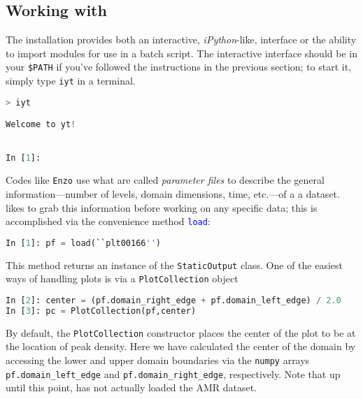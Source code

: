 
\subsection{Working with \yt}
The \yt installation provides both an interactive, {\it iPython}-like,
interface or the ability to import \yt modules for use in a batch
script.  The interactive interface should be in your {\tt \$PATH} if
you've followed the instructions in the previous section; to start it,
simply type {\tt iyt} in a terminal.
\begin{lstlisting}[language=Python]
> iyt

Welcome to yt!


In [1]: 
\end{lstlisting}
Codes like {\tt Enzo} use what are called {\it parameter files} to
describe the general information---number of levels, domain
dimensions, time, etc.---of a a dataset.  \yt likes to grab this
information before working on any specific data; this is accomplished
via the convenience method \textcolor{blue}{\tt load}:
\begin{lstlisting}[language=Python]
In [1]: pf = load(``plt00166'')
\end{lstlisting}
This method returns an instance of the {\tt StaticOutput} class.  One
of the easiest ways of handling plots is via a {\tt PlotCollection}
object
\begin{lstlisting}[language=Python]
In [2]: center = (pf.domain_right_edge + pf.domain_left_edge) / 2.0
In [3]: pc = PlotCollection(pf,center)
\end{lstlisting}
By default, the {\tt PlotCollection} constructor places the center of
the plot to be at the location of peak density.  Here we have
calculated the center of the domain by accessing the lower and upper
domain boundaries via the {\tt numpy} arrays {\tt
  pf.domain\_left\_edge} and {\tt pf.domain\_right\_edge},
respectively.  Note that up until this point, \yt has not actually
loaded the AMR dataset.

